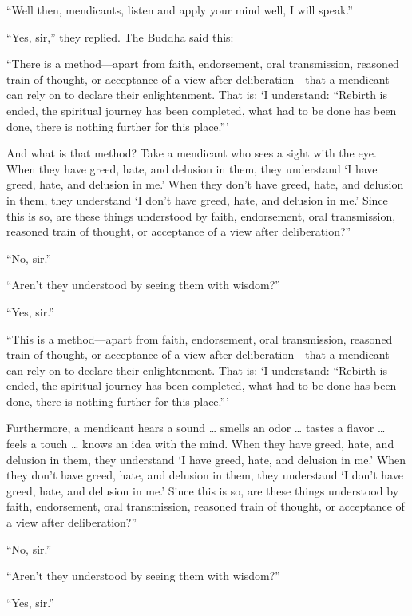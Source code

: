 \documentclass[12pt,openany]{book}%
\begin{document}
“Well then, mendicants, listen and apply your mind well, I will speak.” 

“Yes, sir,” they replied. The Buddha said this: 

“There is a method—apart from faith, endorsement, oral transmission, reasoned train of thought, or acceptance of a view after deliberation—that a mendicant can rely on to declare their enlightenment. That is: ‘I understand: “Rebirth is ended, the spiritual journey has been completed, what had to be done has been done, there is nothing further for this place.”’ 

And what is that method? Take a mendicant who sees a sight with the eye. When they have greed, hate, and delusion in them, they understand ‘I have greed, hate, and delusion in me.’ When they don’t have greed, hate, and delusion in them, they understand ‘I don’t have greed, hate, and delusion in me.’ Since this is so, are these things understood by faith, endorsement, oral transmission, reasoned train of thought, or acceptance of a view after deliberation?” 

“No, sir.” 

“Aren’t they understood by seeing them with wisdom?” 

“Yes, sir.” 

“This is a method—apart from faith, endorsement, oral transmission, reasoned train of thought, or acceptance of a view after deliberation—that a mendicant can rely on to declare their enlightenment. That is: ‘I understand: “Rebirth is ended, the spiritual journey has been completed, what had to be done has been done, there is nothing further for this place.”’ 

Furthermore, a mendicant hears a sound … smells an odor … tastes a flavor … feels a touch … knows an idea with the mind. When they have greed, hate, and delusion in them, they understand ‘I have greed, hate, and delusion in me.’ When they don’t have greed, hate, and delusion in them, they understand ‘I don’t have greed, hate, and delusion in me.’ Since this is so, are these things understood by faith, endorsement, oral transmission, reasoned train of thought, or acceptance of a view after deliberation?” 

“No, sir.” 

“Aren’t they understood by seeing them with wisdom?” 

“Yes, sir.” 
\end{document}
